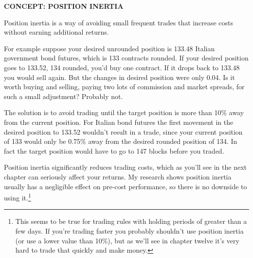  \begingroup \small \centering
{}
\par \endgroup

\medskip \noindent\textbf{CONCEPT: POSITION INERTIA}

Position inertia is a way of avoiding small frequent trades that increase costs without earning additional returns.

For example suppose your desired unrounded position is 133.48 Italian government bond futures, which is 133 contracts rounded. If your desired position goes to 133.52, 134 rounded, you’d buy one contract. If it drops back to 133.48 you would sell again. But the changes in desired position were only 0.04. Is it worth buying and selling, paying two lots of commission and market spreads, for such a small adjustment? Probably not.

The solution is to avoid trading until the target position is more than 10\% away from the current position. For Italian bond futures the first movement in the desired position to 133.52 wouldn’t result in a trade, since your current position of 133 would only be 0.75\% away from the desired rounded position of 134. In fact the target position would have to go to 147 blocks before you traded.

Position inertia significantly reduces trading costs, which as you’ll see in the next chapter can seriously affect your returns. My research shows position inertia usually has a negligible effect on pre-cost performance, so there is no downside to using it.\footnote{This seems to be true for trading rules with holding periods of greater than a few days. If you’re trading faster you probably shouldn’t use position inertia (or use a lower value than 10\%), but as we’ll see in chapter twelve it’s very hard to trade that quickly and make money.}

